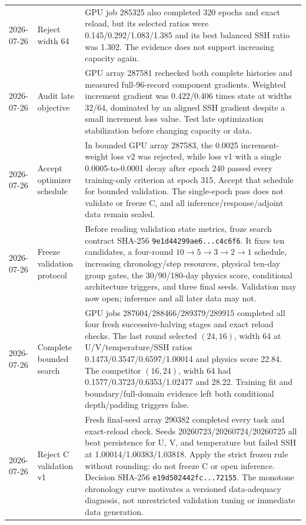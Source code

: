 \documentclass[11pt]{article}
\begin{document}
\begin{longtable}{@{}p{}p{}p{}@{}}
2026-07-26 & Reject width 64 & GPU job 285325 also completed 320 epochs and exact reload, but its selected ratios were 0.145/0.292/1.083/1.385 and its best balanced SSH ratio was 1.302.  The evidence does not support increasing capacity again. \\
2026-07-26 & Audit late objective & GPU array 287581 rechecked both complete histories and measured full-96-record component gradients.  Weighted increment gradient was 0.422/0.406 times state at widths 32/64, dominated by an aligned SSH gradient despite a small increment loss value.  Test late optimization stabilization before changing capacity or data. \\
2026-07-26 & Accept optimizer schedule & In bounded GPU array 287583, the 0.0025 increment-weight loss v2 was rejected, while loss v1 with a single 0.0005-to-0.0001 decay after epoch 240 passed every training-only criterion at epoch 315.  Accept that schedule for bounded validation.  The single-epoch pass does not validate or freeze C, and all inference/response/adjoint data remain sealed. \\
2026-07-26 & Freeze validation protocol & Before reading validation state metrics, froze search contract SHA-256 \texttt{9e1d44299ae6...c4c6f6}.  It fixes ten candidates, a four-round \(10\rightarrow5\rightarrow3\rightarrow2\rightarrow1\) schedule, increasing chronology/step resources, physical ten-day group gates, the 30/90/180-day physics score, conditional architecture triggers, and three final seeds.  Validation may now open; inference and all later data may not. \\
2026-07-26 & Complete bounded search & GPU jobs 287604/288466/289379/289915 completed all four fresh successive-halving stages and exact reload checks.  The last round selected \((24,16)\), width 64 at U/V/temperature/SSH ratios 0.1473/0.3547/0.6597/1.00014 and physics score 22.84.  The competitor \((16,24)\), width 64 had 0.1577/0.3723/0.6353/1.02477 and 28.22.  Training fit and boundary/full-domain evidence left both conditional depth/padding triggers false. \\
2026-07-26 & Reject C validation v1 & Fresh final-seed array 290382 completed every task and exact-reload check.  Seeds 20260723/20260724/20260725 all beat persistence for U, V, and temperature but failed SSH at 1.00014/1.00383/1.03818.  Apply the strict frozen rule without rounding: do not freeze C or open inference.  Decision SHA-256 \texttt{e19d502442fc...72155}.  The monotone chronology curve motivates a versioned data-adequacy diagnosis, not unrestricted validation tuning or immediate data generation. \\

\end{longtable}
\end{document}

